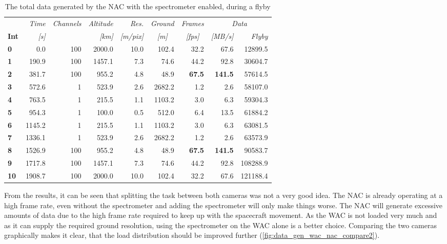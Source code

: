 \begin{table}[htb]
  \centering
    \begin{tabular}{l|r|r|r|r|r|r|r|r|}
      & \textit{Time} & \textit{Channels} & \textit{Altitude} & \textit{Res.} & \textit{Ground} & \textit{Frames } & \multicolumn{2}{c}{\textit{Data}} \\
\textbf{Int} & \textit{[s]} & \textit{} & \textit{[km]} & \textit{[m/pix]} & \multicolumn{1}{c|}{\textit{[m]}} & \multicolumn{1}{c|}{\textit{[fps]}} & \textit{[MB/s]} & \multicolumn{1}{r}{\textit{Flyby}} \bigstrut[b]\\
\hline
\textbf{0} & 0.0   & 100   & 2000.0 & 10.0  & 102.4 & 32.2  & 67.6  & 12899.5 \bigstrut[t]\\
\textbf{1} & 190.9 & 100   & 1457.1 & 7.3   & 74.6  & 44.2  & 92.8  & 30604.7 \\
\textbf{2} & 381.7 & 100   & 955.2 & 4.8   & 48.9  & \textbf{67.5} & \textbf{141.5} & 57614.5 \\
\textbf{3} & 572.6 & 1     & 523.9 & 2.6   & 2682.2 & 1.2   & 2.6   & 58107.0 \\
\textbf{4} & 763.5 & 1     & 215.5 & 1.1   & 1103.2 & 3.0   & 6.3   & 59304.3 \\
\textbf{5} & 954.3 & 1     & 100.0 & 0.5   & 512.0 & 6.4   & 13.5  & 61884.2 \\
\textbf{6} & 1145.2 & 1     & 215.5 & 1.1   & 1103.2 & 3.0   & 6.3   & 63081.5 \\
\textbf{7} & 1336.1 & 1     & 523.9 & 2.6   & 2682.2 & 1.2   & 2.6   & 63573.9 \\
\textbf{8} & 1526.9 & 100   & 955.2 & 4.8   & 48.9  & \textbf{67.5} & \textbf{141.5} & 90583.7 \\
\textbf{9} & 1717.8 & 100   & 1457.1 & 7.3   & 74.6  & 44.2  & 92.8  & 108288.9 \\
\textbf{10} & 1908.7 & 100   & 2000.0 & 10.0  & 102.4 & 32.2  & 67.6  & 121188.4 \\
\end{tabular}%
    \caption{The total data generated by the NAC with the spectrometer enabled, during a flyby}
  \label{tab:nac_flyby_data_spectrometer}%
\end{table}%
From the results, it can be seen that splitting the task between both cameras was not a very good idea. The NAC is already operating at a high frame rate, even without the spectrometer and adding the spectrometer will only make things worse. The NAC will generate excessive amounts of data due to the high frame rate required to keep up with the spacecraft movement. As the WAC is not loaded very much and as it can supply the required ground resolution, using the spectrometer on the WAC alone is a better choice. Comparing the two cameras graphically makes it clear, that the load distribution should be improved further (\ref{fig:data_gen_wac_nac_compare2}).
